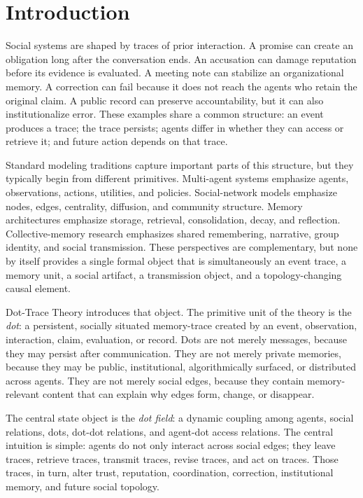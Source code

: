 \documentclass[11pt]{article}
\theoremstyle{remark}
\begin{document}
\tableofcontents
\newpage

\section{Introduction}\label{introduction}

Social systems are shaped by traces of prior interaction. A promise can create an obligation long after the conversation ends. An accusation can damage reputation before its evidence is evaluated. A meeting note can stabilize an organizational memory. A correction can fail because it does not reach the agents who retain the original claim. A public record can preserve accountability, but it can also institutionalize error. These examples share a common structure: an event produces a trace; the trace persists; agents differ in whether they can access or retrieve it; and future action depends on that trace.

Standard modeling traditions capture important parts of this structure, but they typically begin from different primitives. Multi-agent systems emphasize agents, observations, actions, utilities, and policies. Social-network models emphasize nodes, edges, centrality, diffusion, and community structure. Memory architectures emphasize storage, retrieval, consolidation, decay, and reflection. Collective-memory research emphasizes shared remembering, narrative, group identity, and social transmission. These perspectives are complementary, but none by itself provides a single formal object that is simultaneously an event trace, a memory unit, a social artifact, a transmission object, and a topology-changing causal element.

Dot-Trace Theory introduces that object. The primitive unit of the theory is the \emph{dot}: a persistent, socially situated memory-trace created by an event, observation, interaction, claim, evaluation, or record. Dots are not merely messages, because they may persist after communication. They are not merely private memories, because they may be public, institutional, algorithmically surfaced, or distributed across agents. They are not merely social edges, because they contain memory-relevant content that can explain why edges form, change, or disappear.

The central state object is the \emph{dot field}: a dynamic coupling among agents, social relations, dots, dot-dot relations, and agent-dot access relations. The central intuition is simple: agents do not only interact across social edges; they leave traces, retrieve traces, transmit traces, revise traces, and act on traces. Those traces, in turn, alter trust, reputation, coordination, correction, institutional memory, and future social topology.
\end{document}
